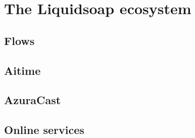 \chapter{The Liquidsoap ecosystem}
\section{Flows}

\section{Aitime}

\section{AzuraCast}

\section{Online services}
